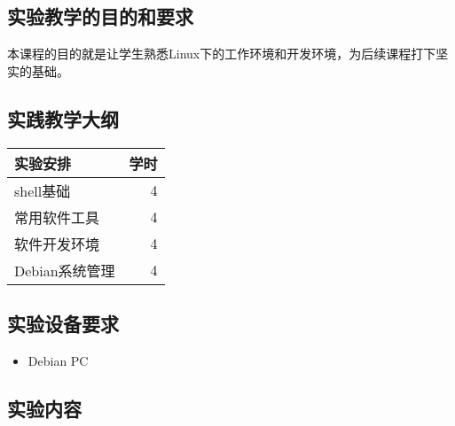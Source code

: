 \documentclass{wx672ctexart}
\begin{document}
\subsection{实验教学的目的和要求}
本课程的目的就是让学生熟悉Linux下的工作环境和开发环境，为后续课程打下坚实的基础。

\subsection{实践教学大纲}

\begin{center}
  \begin{tabular}{lr}
    \hline
    实验安排        &  学时  \\
    \hline
    shell基础       &    4  \\
    常用软件工具    &     4  \\
    软件开发环境    &     4  \\
    Debian系统管理  &     4  \\
    \hline
  \end{tabular}
\end{center}

\subsection{实验设备要求}

\begin{itemize}
\item Debian PC
\end{itemize}

\subsection{实验内容}
\end{document}
